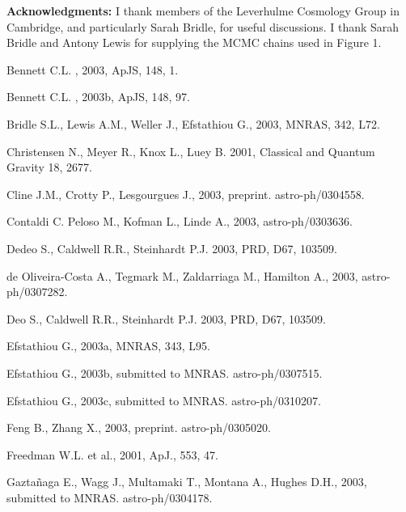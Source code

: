 \medskip

\noindent
{\bf Acknowledgments:} I thank members of the Leverhulme Cosmology
Group in Cambridge, and particularly Sarah Bridle, for useful
discussions. I thank Sarah Bridle and Antony Lewis for supplying the
MCMC chains used in Figure 1.


\medskip

\begin{thebibliography}{}




Bennett C.L. \etal, 2003, ApJS, 148, 1.

Bennett C.L. \etal, 2003b, ApJS, 148, 97.

Bridle S.L., Lewis A.M., Weller J., Efstathiou G., 2003,
MNRAS, 342, L72.


Christensen N., Meyer R., Knox L., Luey B. 
2001, Classical and Quantum Gravity 18, 2677.

Cline J.M., Crotty P., Lesgourgues J., 2003, preprint. astro-ph/0304558.

Contaldi C. Peloso M., Kofman L., Linde A., 2003, astro-ph/0303636.



Dedeo S., Caldwell R.R., Steinhardt P.J. 2003, PRD, D67, 103509.

de Oliveira-Costa A., Tegmark M.,  Zaldarriaga M., Hamilton A., 
2003, astro-ph/0307282.

Deo S., Caldwell R.R., Steinhardt P.J. 2003, PRD, D67, 103509.

Efstathiou G.,  2003a, MNRAS, 343, L95.

Efstathiou G.,  2003b, submitted to MNRAS. astro-ph/0307515.

Efstathiou G.,  2003c, submitted to MNRAS. astro-ph/0310207.

Feng B., Zhang X., 2003, preprint. astro-ph/0305020.

Freedman W.L. et al., 2001, ApJ., 553, 47.

Gazta\~naga E., Wagg J., Multamaki T., Montana A., Hughes D.H.,
2003, submitted to MNRAS. astro-ph/0304178.


\end{thebibliography}

